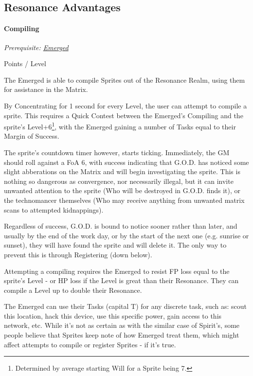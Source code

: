 \begin{multicols*}{3}
	\subsection{Resonance Advantages}
	
	\paragraph{Compiling}\label{compiling}
	\textit{Prerequisite: \hyperref[emerged]{Emerged}}
	\begin{flushright}
		 Points / Level
	\end{flushright}

	The Emerged is able to compile Sprites out of the Resonance Realm, using them for assistance in the Matrix.
	
	By Concentrating for 1 second for every Level, the user can attempt to compile a sprite. This requires a Quick Contest between the Emerged's Compiling and the sprite's Level+6\footnote{Determined by average starting Will for a Sprite being 7.}, with the Emerged gaining a number of Tasks equal to their Margin of Success. 
	
	The sprite's countdown timer however, starts ticking. Immediately, the GM should roll against a FoA 6, with success indicating that G.O.D. has noticed some slight abberations on the Matrix and will begin investigating the sprite. This is nothing so dangerous as convergence, nor necessarily illegal, but it can invite unwanted attention to the sprite (Who will be destroyed in G.O.D. finds it), or the technomancer themselves (Who may receive anything from unwanted matrix scans to attempted kidnappings). 
	
	Regardless of success, G.O.D. is bound to notice sooner rather than later, and usually by the end of the work day, or by the start of the next one (e.g. sunrise or sunset), they will have found the sprite and will delete it. The only way to prevent this is through Registering (down below).
	
	Attempting a compiling requires the Emerged to resist FP loss equal to the sprite's Level - or HP loss if the Level is great than their Resonance. They can compile a Level up to double their Resonance.
	
	The Emerged can use their Tasks (capital T) for any discrete task, such as: scout this location, hack this device, use this specific power, gain access to this network, etc. While it's not as certain as with the similar case of Spirit's, some people believe that Sprites keep note of how Emerged treat them, which might affect attempts to compile or register Sprites - if it's true.
	

\end{multicols*}
